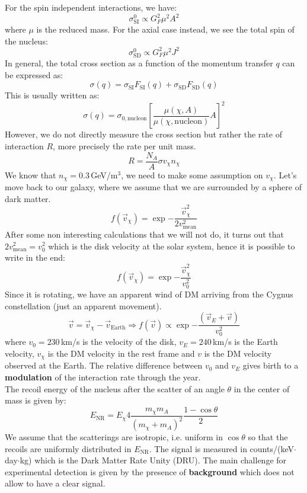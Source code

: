 \documentclass[10.75pt,a4paper,openright,bottom=2cm]{article}
\begin{document}
For the spin independent interactions, we have:
\[
\sigma_{\text{SI}}^0\propto G_F^2\mu^2A^2
\]
where $\mu$ is the reduced mass. For the axial case instead, we see the total spin of the nucleus:
\[
\sigma_{\text{SD}}^0\propto G_F^2\mu^2J^2
\]
In general, the total cross section as a function of the momentum transfer $q$ can be expressed as:
\[
\sigma(q)=\sigma_{\text{SI}}F_{\text{SI}}(q)+\sigma_{\text{SD}}F_{\text{SD}}(q)
\]
This is usually written as:
\[
\sigma(q)=\sigma_{0,\text{nucleon}}\left[\frac{\mu(\chi,A)}{\mu(\chi,\text{nucleon})}A\right]^2
\]
However, we do not directly measure the cross section but rather the rate of interaction $R$, more precisely the rate per unit mass.
\[
R=\frac{N_A}{A}\sigma v_\chi n_\chi
\]
We know that $n_\chi=0.3$\,GeV/m$^3$, we need to make some assumption on $v_\chi$. Let's move back to our galaxy, where we assume that we are surrounded by a sphere of dark matter.
\[
f(\Vec{v}_\chi)=\exp{-\frac{\Vec{v}_\chi^2}{2v_{\text{mean}}^2}}
\]
After some non interesting calculations that we will not do, it turns out that $2v_{\text{mean}}^2=v_0^2$ which is the disk velocity at the solar system, hence it is possible to write in the end:
\[
f(\Vec{v}_\chi)=\exp{-\frac{\Vec{v}_\chi^2}{v_0^2}}
\]
Since it is rotating, we have an apparent wind of DM arriving from the Cygnus constellation (just an apparent movement).
\[
\Vec{v}=\Vec{v}_\chi-\Vec{v}_{\text{Earth}}\Rightarrow f(\Vec{v})\propto\exp{-\frac{(\Vec{v}_E+\Vec{v})}{v_0^2}}
\]
where $v_0=230$\,km/s is the velocity of the disk, $v_E=240$\,km/s is the Earth velocity, $v_\chi$ is the DM velocity in the rest frame and $v$ is the DM velocity observed at the Earth. The relative difference between $v_0$ and $v_E$ gives birth to a \textbf{modulation} of the interaction rate through the year.\\
The recoil energy of the nucleus after the scatter of an angle $\theta$ in the center of mass is given by:
\[
E_{\text{NR}}=E_\chi 4\frac{m_\chi m_A}{(m_\chi+m_A)^2}\frac{1-\cos\theta}{2}
\]
We assume that the scatterings are isotropic, i.e. uniform in $\cos\theta$ so that the recoils are uniformly distributed in $E_{\text{NR}}$. The signal is measured in counts/(keV$\cdot$day$\cdot$kg) which is the Dark Matter Rate Unity (DRU). The main challenge for experimental detection is given by the presence of \textbf{background} which does not allow to have a clear signal.\\
\end{document}
